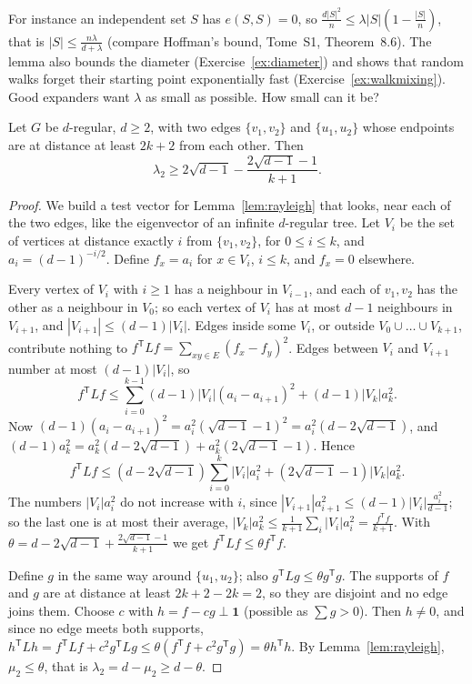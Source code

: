 For instance an independent set $S$ has $e(S,S)=0$, so $\frac{d|S|^2}n\le\lambda|S|(1-\frac{|S|}n)$, that is $|S|\le\frac{n\lambda}{d+\lambda}$ (compare Hoffman's bound, Tome~S1, Theorem~8.6). The lemma also
bounds the diameter (Exercise~\ref{ex:diameter}) and shows that random walks forget their starting point exponentially fast (Exercise~\ref{ex:walkmixing}). Good expanders want $\lambda$ as small as
possible. How small can it be?

\begin{theorem}\label{thm:alonboppana}
Let $G$ be $d$-regular, $d\ge2$, with two edges $\{v_1,v_2\}$ and $\{u_1,u_2\}$ whose endpoints are at distance at least $2k+2$ from each other. Then
\[
\lambda_2\ge2\sqrt{d-1}-\frac{2\sqrt{d-1}-1}{k+1}.
\]
\end{theorem}
\begin{proof}
We build a test vector for Lemma~\ref{lem:rayleigh} that looks, near each of the two edges, like the eigenvector of an infinite $d$-regular tree. Let $V_i$ be the set of vertices at distance
exactly $i$ from $\{v_1,v_2\}$, for $0\le i\le k$, and $a_i=(d-1)^{-i/2}$. Define $f_x=a_i$ for $x\in V_i$, $i\le k$, and $f_x=0$ elsewhere.

Every vertex of $V_i$ with $i\ge1$ has a neighbour in $V_{i-1}$, and each of $v_1,v_2$ has the other as a neighbour in $V_0$; so each vertex of $V_i$ has at most $d-1$ neighbours in $V_{i+1}$, and
$|V_{i+1}|\le(d-1)|V_i|$. Edges inside some $V_i$, or outside $V_0\cup\dots\cup V_{k+1}$, contribute nothing to $f^{\mathsf T}Lf=\sum_{xy\in E}(f_x-f_y)^2$. Edges between $V_i$ and $V_{i+1}$ number at most
$(d-1)|V_i|$, so
\[
f^{\mathsf T}Lf\le\sum_{i=0}^{k-1}(d-1)|V_i|(a_i-a_{i+1})^2+(d-1)|V_k|a_k^2.
\]
Now $(d-1)(a_i-a_{i+1})^2=a_i^2(\sqrt{d-1}-1)^2=a_i^2(d-2\sqrt{d-1})$, and $(d-1)a_k^2=a_k^2(d-2\sqrt{d-1})+a_k^2(2\sqrt{d-1}-1)$. Hence
\[
f^{\mathsf T}Lf\le(d-2\sqrt{d-1})\sum_{i=0}^k|V_i|a_i^2+(2\sqrt{d-1}-1)|V_k|a_k^2.
\]
The numbers $|V_i|a_i^2$ do not increase with $i$, since $|V_{i+1}|a_{i+1}^2\le(d-1)|V_i|\frac{a_i^2}{d-1}$; so the last one is at most their average, $|V_k|a_k^2\le\frac1{k+1}\sum_i|V_i|a_i^2=\frac{f^{\mathsf T}f}{k+1}$. With
$\theta=d-2\sqrt{d-1}+\frac{2\sqrt{d-1}-1}{k+1}$ we get $f^{\mathsf T}Lf\le\theta f^{\mathsf T}f$.

Define $g$ in the same way around $\{u_1,u_2\}$; also $g^{\mathsf T}Lg\le\theta g^{\mathsf T}g$. The supports of $f$ and $g$ are at distance at least $2k+2-2k=2$, so they are disjoint and no edge joins them.
Choose $c$ with $h=f-cg\perp\mathbf1$ (possible as $\sum g>0$). Then $h\ne0$, and since no edge meets both supports, $h^{\mathsf T}Lh=f^{\mathsf T}Lf+c^2g^{\mathsf T}Lg\le\theta(f^{\mathsf T}f+c^2g^{\mathsf T}g)=\theta h^{\mathsf T}h$. By
Lemma~\ref{lem:rayleigh}, $\mu_2\le\theta$, that is $\lambda_2=d-\mu_2\ge d-\theta$.
\end{proof}

